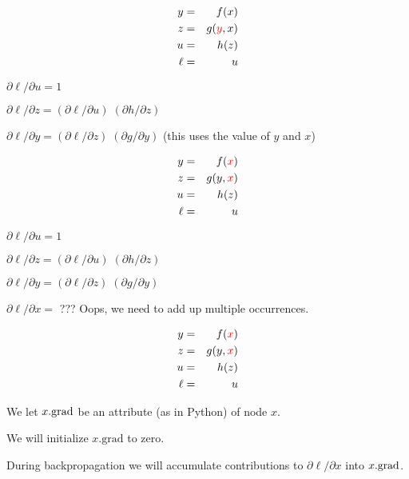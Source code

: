{
\vspace{-3ex}
\begin{eqnarray*}
  y & = & f(x) \\
  z & = & g({\color{red} y},x) \\
  u & = & h(z) \\
  \ell &  = &  u
\end{eqnarray*}

\medskip
${\partial \ell}/{\partial u} = 1$

\medskip
${\partial \ell}/{\partial z} = ({\partial \ell}/{\partial u})\; ({\partial h}/{\partial z})$

\medskip
{\color{red} ${\partial \ell}/{\partial y} = ({\partial \ell}/{\partial z})\; ({\partial g}/{\partial y})$} (this uses the value of $y$ and $x$)

\vspace{-3ex}
\begin{eqnarray*}
  y & = & f({\color{red} x}) \\
  z & = & g(y,{\color{red} x}) \\
  u & = & h(z) \\
  \ell &  = &  u
\end{eqnarray*}

\medskip
${\partial \ell}/{\partial u} = 1$

\medskip
${\partial \ell}/{\partial z} = ({\partial \ell}/{\partial u})\; ({\partial h}/{\partial z})$

\medskip
${\partial \ell}/{\partial y} = ({\partial \ell}/{\partial z})\; ({\partial g}/{\partial y})$

\medskip
{\color{red} ${\partial \ell}/{\partial x} =$ ???} Oops, we need to add up multiple occurrences.

\vspace{-3ex}
\begin{eqnarray*}
  y & = & f({\color{red} x}) \\
  z & = & g(y,{\color{red} x}) \\
  u & = & h(z) \\
  \ell &  = &  u
\end{eqnarray*}

\medskip
We let {\color{red} $x.\mathrm{grad}$} be an attribute (as in Python) of node {\color{red} $x$}.

\bigskip
\bigskip
We will initialize {\color{red} $x.\mathrm{grad}$} to zero.

\bigskip
\bigskip
During backpropagation we will accumulate contributions to {\color{red} ${\partial \ell}/{\partial x}$} into {\color{red} $x.\mathrm{grad}$}.


}
